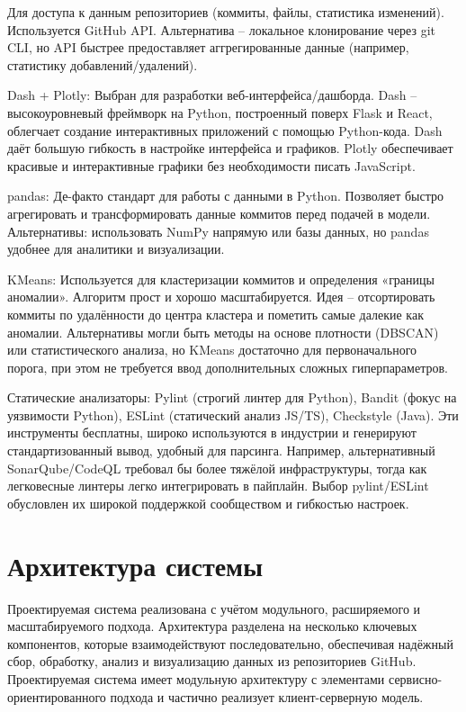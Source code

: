 Для доступа к данным репозиториев (коммиты, файлы, статистика изменений). Используется GitHub API. Альтернатива – локальное клонирование через git CLI, но API быстрее предоставляет аггрегированные данные (например, статистику добавлений/удалений).

Dash + Plotly: Выбран для разработки веб-интерфейса/дашборда. Dash – высокоуровневый фреймворк на Python, построенный поверх Flask и React, облегчает создание интерактивных приложений с помощью Python-кода. Dash даёт большую гибкость в настройке интерфейса и графиков. Plotly обеспечивает красивые и интерактивные графики без необходимости писать JavaScript.

pandas: Де-факто стандарт для работы с данными в Python. Позволяет быстро агрегировать и трансформировать данные коммитов перед подачей в модели. Альтернативы: использовать NumPy напрямую или базы данных, но pandas удобнее для аналитики и визуализации.

KMeans: Используется для кластеризации коммитов и определения «границы аномалии». Алгоритм прост и хорошо масштабируется. Идея – отсортировать коммиты по удалённости до центра кластера и пометить самые далекие как аномалии. Альтернативы могли быть методы на основе плотности (DBSCAN) или статистического анализа, но KMeans достаточно для первоначального порога, при этом не требуется ввод дополнительных сложных гиперпараметров.

Статические анализаторы: Pylint (строгий линтер для Python), Bandit (фокус на уязвимости Python), ESLint (статический анализ JS/TS), Checkstyle (Java). Эти инструменты бесплатны, широко используются в индустрии и генерируют стандартизованный вывод, удобный для парсинга. Например, альтернативный SonarQube/CodeQL требовал бы более тяжёлой инфраструктуры, тогда как легковесные линтеры легко интегрировать в пайплайн. Выбор pylint/ESLint обусловлен их широкой поддержкой сообществом и гибкостью настроек.

\section{Архитектура системы} \label{ch2:2.4}

Проектируемая система реализована с учётом модульного, расширяемого и масштабируемого подхода. Архитектура разделена на несколько ключевых компонентов, которые взаимодействуют последовательно, обеспечивая надёжный сбор, обработку, анализ и визуализацию данных из репозиториев GitHub. Проектируемая система имеет модульную архитектуру с элементами сервисно-ориентированного подхода и частично реализует клиент-серверную модель.

